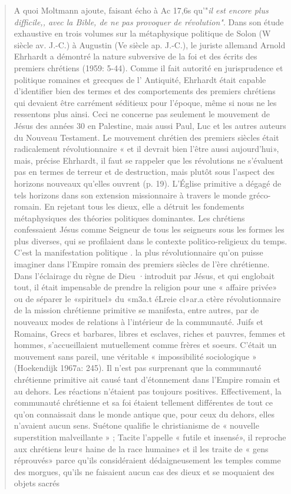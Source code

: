 \begin{quote}
    A quoi Moltmann ajoute, faisant écho à Ac 17,6s qu'"\textit{il est encore plus difficile,, avec la Bible, de ne pas provoquer de
révolution"}. Dans son étude exhaustive en trois volumes sur la métaphysique
politique de Solon (W siècle av. J.-C.) à Augustin (Ve siècle ap. J.-C.),
le juriste allemand Arnold Ehrhardt a démontré la nature subversive de
la foi et des écrits des premiers chrétiens (1959: 5-44). Comme il fait
autorité en jurisprudence et politique romaines et grecques de
l' Antiquité, Ehrhardt était capable d'identifier bien des termes et des
comportements des premiers chrétiens qui devaient être carrément
séditieux pour l'époque, même si nous ne les ressentons plus ainsi.
Ceci ne concerne pas seulement le mouvement de Jésus des années 30
en Palestine, mais aussi Paul, Luc et les autres auteurs du Nouveau
Testament. Le mouvement chrétien des premiers siècles était radicalement
révolutionnaire « et il devrait bien l'être aussi aujourd'hui»,
mais, précise Ehrhardt, il faut se rappeler que les révolutions ne
s'évaluent pas en termes de terreur et de destruction, mais plutôt sous
l'aspect des horizons nouveaux qu'elles ouvrent (p. 19). L'Église
primitive a dégagé de tels horizons dans son extension missionnaire à
travers le monde gréco-romain. En rejetant tous les dieux, elle a détruit
les fondements métaphysiques des théories politiques dominantes. Les
chrétiens confessaient Jésus comme Seigneur de tous les seigneurs
sous les formes les plus diverses, qui se profilaient dans le contexte
politico-religieux du temps. C'est la manifestation politique . la plus
révolutionnaire qu'on puisse imaginer dans l'Empire romain des
premiers siècles de l'ère chrétienne. Dans l'éclairage du règne de Dieu
·introduit par Jésus, et qui englobait tout, il était impensable de prendre
la religion pour une « affaire privée» ou de séparer le «spirituel» du
«m3a.t éLreie cl»ar.a ctère révolutionnaire de la mission chrétienne primitive se
manifesta, entre autres, par de nouveaux modes de relations à l'intérieur de la communauté. Juifs et Romains, Grecs et barbares,
libres et esclaves, riches et pauvres, femmes et hommes, s'accueillaient
mutuellement comme frères et soeurs. C'était un mouvement sans
pareil, une véritable « impossibilité sociologique » (Hoekendijk
1967a: 245). Il n'est pas surprenant que la communauté chrétienne
primitive ait causé tant d'étonnement dans l'Empire romain et au
dehors. Les réactions n'étaient pas toujours positives. Effectivement, la
communauté chrétienne et sa foi étaient tellement différentes de tout
ce qu'on connaissait dans le monde antique que, pour ceux du dehors,
elles n'avaient aucun sens. Suétone qualifie le christianisme de
« nouvelle superstition malveillante » ; Tacite l'appelle « futile et
insensé», il reproche aux chrétiens leur« haine de la race humaine» et
il les traite de « gens réprouvés» parce qu'ils considéraient
dédaigneusement les temples comme des morgues, qu'ils ne faisaient
aucun cas des dieux et se moquaient des objets sacrés \end{quote}

